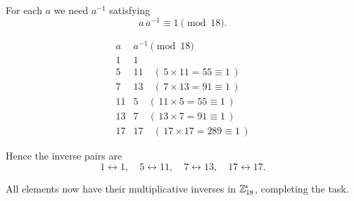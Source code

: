 \documentclass[12pt]{article}
\theoremstyle{definition} %
\theoremstyle{plain} %
\begin{document}
For each \(a\) we need \(a^{-1}\) satisfying
\[
a\,a^{-1}\equiv 1 \pmod{18}.
\]

\[
\renewcommand{\arraystretch}{1.3}
\begin{array}{c|c}
a & a^{-1}\pmod{18}\\\hline
 1 & 1 \\[2pt]
 5 & 11 \quad(\,5\!\times\!11 = 55 \equiv 1\,)\\
 7 & 13 \quad(\,7\!\times\!13 = 91 \equiv 1\,)\\
11 & 5  \quad(\,11\!\times\!5 = 55 \equiv 1\,)\\
13 & 7  \quad(\,13\!\times\!7 = 91 \equiv 1\,)\\
17 & 17 \quad(\,17\!\times\!17 = 289 \equiv 1\,)
\end{array}
\]

Hence the inverse pairs are
\[
1\leftrightarrow 1,\quad
5\leftrightarrow 11,\quad
7\leftrightarrow 13,\quad
17\leftrightarrow 17.
\]

All elements now have their multiplicative inverses in
\(\Bbb Z_{18}^{\!*}\), completing the task.

\newcommand{\pow}[2]{#1^{#2}}
\end{document}
